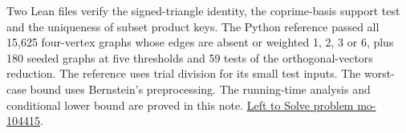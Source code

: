 \documentclass[11pt,letterpaper]{article}
\begin{document}
Two Lean files verify the signed-triangle identity, the coprime-basis support test and the uniqueness of subset product keys. The Python reference passed all 15,625 four-vertex graphs whose edges are absent or weighted 1, 2, 3 or 6, plus 180 seeded graphs at five thresholds and 59 tests of the orthogonal-vectors reduction. The reference uses trial division for its small test inputs. The worst-case bound uses Bernstein's preprocessing. The running-time analysis and conditional lower bound are proved in this note. \href{https://lefttosolve.com/p/mo-104415}{Left to Solve problem mo-104415}.
\end{document}
